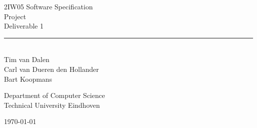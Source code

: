 \begin{titlepage}
	\begin{center}

		{\Huge 2IW05 Software Specification\\ Project}\\[0.5cm]
		{\huge Deliverable 1}\\
		\rule{\linewidth}{0.5mm}\\[0.5cm]


		{\Large
		Tim van Dalen\\
		Carl van Dueren den Hollander\\
		Bart Koopmans\\[1cm]
		}

		{\large
		Department of Computer Science\\
		Technical University Eindhoven\\[1cm]
		}

		

		\vfill

		{\large \today}
	\end{center}
\end{titlepage}